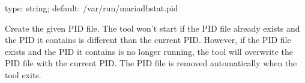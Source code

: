 \documentclass[letterpaper,10pt,english]{sphinxmanual}
\begin{document}

\begin{fulllineitems}
\label{\detokenize{mariadb-stat:cmdoption-mariadb-stat-pid}}
\sphinxAtStartPar
type: string; default: /var/run/mariadb\sphinxhyphen{}stat.pid

\sphinxAtStartPar
Create the given PID file.  The tool won’t start if the PID file already
exists and the PID it contains is different than the current PID.  However,
if the PID file exists and the PID it contains is no longer running, the
tool will overwrite the PID file with the current PID.  The PID file is
removed automatically when the tool exits.

\end{fulllineitems}

\end{document}
